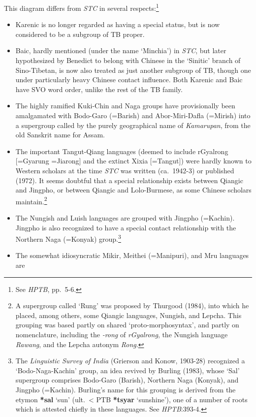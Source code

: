 This diagram differs from \textit{STC} in several respects:\footnote{See \textit{HPTB}, pp.~5-6.}
\begin{itemize}
\item Karenic is no longer regarded as having a special status, but is now
considered to be a subgroup of TB proper.
\item Baic, hardly mentioned (under the name ‘Minchia’) in \textit{STC}, but later
hypothesized by Benedict to belong with Chinese in the ‘Sinitic’ branch of 
Sino-Tibetan, is now also treated as just another subgroup of TB, though one
under particularly heavy Chinese contact influence. Both Karenic and Baic have
SVO word order, unlike the rest of the TB family.
\item The highly ramified Kuki-Chin and Naga groups have provisionally been
amalgamated with Bodo-Garo (=Barish) and Abor-Miri-Dafla (=Mirish) into a
supergroup called by the purely geographical name of \textit{Kamarupan}, from the old
Sanskrit name for Assam.
\item The important Tangut-Qiang languages (deemed to include rGyalrong
[=Gyarung =Jiarong] and the extinct Xixia [=Tangut]) were hardly known to Western
scholars at the time \textit{STC} was written (ca.~1942-3) or published (1972). It seems
doubtful that a special relationship exists between Qiangic and Jingpho, or
between Qiangic and Lolo-Burmese, as some Chinese scholars maintain.\footnote{A
supergroup called ‘Rung’ was proposed by Thurgood (1984), into which he placed,
among others, some Qiangic languages, Nungish, and Lepcha.  This grouping was
based partly on shared ‘proto-morphosyntax’, and partly on nomenclature,
including the \textit{-rong} of \textit{rGyalrong},
the Nungish language \textit{Rawang}, and the Lepcha autonym \textit{Rong}.}
\item The Nungish and Luish languages are grouped with Jingpho (=Kachin).  Jingpho
is also recognized to have a special contact relationship with the Northern Naga
(=Konyak) group.\footnote{The \textit{Linguistic Survey of India}
(Grierson and Konow, 1903-28) recognized a ‘Bodo-Naga-Kachin’ group,
an idea revived by Burling
(1983), whose ‘Sal’ supergroup comprises Bodo-Garo (Barish), Northern Naga
(Konyak), and Jingpho (=Kachin).  Burling’s name for this grouping is derived
from the etymon \textbf{*sal} ‘sun’ (ult.\ < PTB \textbf{*tsyar} ‘sunshine’), one of a number of
roots which is attested chiefly in these languages.  See \textit{HPTB}:393-4.}
\item The somewhat idiosyncratic Mikir, Meithei (=Manipuri), and Mru languages are

\end{itemize}
